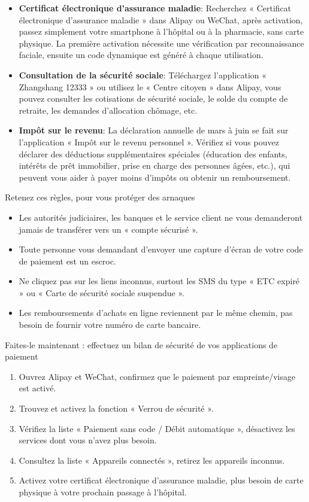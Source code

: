 \begin{itemize}
  \item \textbf{Certificat électronique d'assurance maladie}: Recherchez « Certificat électronique d'assurance maladie » dans Alipay ou WeChat, après activation, passez simplement votre smartphone à l'hôpital ou à la pharmacie, sans carte physique. La première activation nécessite une vérification par reconnaissance faciale, ensuite un code dynamique est généré à chaque utilisation.
  \item \textbf{Consultation de la sécurité sociale}: Téléchargez l'application « Zhangshang 12333 » ou utilisez le « Centre citoyen » dans Alipay, vous pouvez consulter les cotisations de sécurité sociale, le solde du compte de retraite, les demandes d'allocation chômage, etc.
  \item \textbf{Impôt sur le revenu}: La déclaration annuelle de mars à juin se fait sur l'application « Impôt sur le revenu personnel ». Vérifiez si vous pouvez déclarer des déductions supplémentaires spéciales (éducation des enfants, intérêts de prêt immobilier, prise en charge des personnes âgées, etc.), qui peuvent vous aider à payer moins d'impôts ou obtenir un remboursement.
\end{itemize}

\begin{tcbwarn}{Retenez ces règles, pour vous protéger des arnaques}
\begin{itemize}
  \item Les autorités judiciaires, les banques et le service client ne vous demanderont jamais de transférer vers un « compte sécurisé ».
  \item Toute personne vous demandant d'envoyer une capture d'écran de votre code de paiement est un escroc.
  \item Ne cliquez pas sur les liens inconnus, surtout les SMS du type « ETC expiré » ou « Carte de sécurité sociale suspendue ».
  \item Les remboursements d'achats en ligne reviennent par le même chemin, pas besoin de fournir votre numéro de carte bancaire.
\end{itemize}

\end{tcbwarn}

\begin{tcbpractice}{Faites-le maintenant : effectuez un bilan de sécurité de vos applications de paiement}
\begin{enumerate}
  \item Ouvrez Alipay et WeChat, confirmez que le paiement par empreinte/visage est activé.
  \item Trouvez et activez la fonction « Verrou de sécurité ».
  \item Vérifiez la liste « Paiement sans code / Débit automatique », désactivez les services dont vous n'avez plus besoin.
  \item Consultez la liste « Appareils connectés », retirez les appareils inconnus.
  \item Activez votre certificat électronique d'assurance maladie, plus besoin de carte physique à votre prochain passage à l'hôpital.
\end{enumerate}

\end{tcbpractice}
